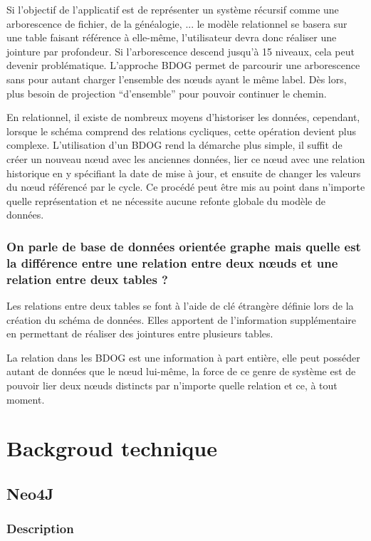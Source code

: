 \documentclass[a4paper,fleqn,12pt]{report}
\begin{document}
Si l’objectif de l’applicatif est de représenter un système récursif comme une arborescence de fichier, de la généalogie, ... le modèle relationnel se basera sur une table faisant référence à elle-même, l’utilisateur devra donc réaliser une jointure par profondeur. Si l’arborescence descend jusqu’à 15 niveaux, cela peut devenir problématique. L’approche BDOG permet de parcourir une arborescence sans pour autant charger l’ensemble des nœuds ayant le même label. Dès lors, plus besoin de projection \enquote{d’ensemble} pour pouvoir continuer le chemin.

En relationnel, il existe de nombreux moyens d’historiser les données, cependant, lorsque le schéma comprend des relations cycliques, cette opération devient plus complexe. L’utilisation d’un BDOG rend la démarche plus simple, il suffit de créer un nouveau nœud avec les anciennes données, lier ce nœud avec une relation historique en y spécifiant la date de mise à jour, et ensuite de changer les valeurs du nœud référencé par le cycle. Ce procédé peut être mis au point dans n’importe quelle représentation et ne nécessite aucune refonte globale du modèle de données.\cite{NoSQLVsSGBDR}\label{noSqlVSRel}

\subsection*{On parle de base de données orientée graphe mais quelle est la différence entre une relation entre deux nœuds et une relation entre deux tables ?}
Les relations entre deux tables se font à l’aide de clé étrangère définie lors de la création du schéma de données. Elles apportent de l’information supplémentaire en permettant de réaliser des jointures entre plusieurs tables.

La relation dans les BDOG est une information à part entière, elle peut posséder autant de données que le nœud lui-même, la force de ce genre de système est de pouvoir lier deux nœuds distincts par n’importe quelle relation et ce, à tout moment.

\chapter{Backgroud technique}
\section{Neo4J}

\subsection{Description}
\end{document}
